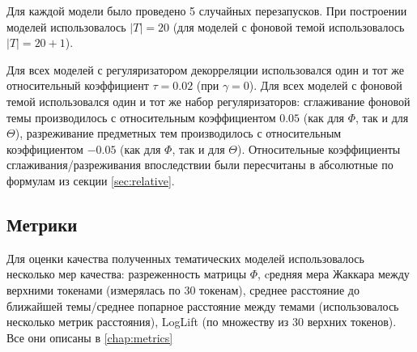 Для каждой модели было проведено 5 случайных перезапусков. При построении моделей использовалось $|T|= 20$ (для моделей с фоновой темой использовалось $|T|= 20+1$).

Для всех моделей с регуляризатором декорреляции использовался один и тот же относительный коэффициент $\tau = 0.02$ (при $\gamma=0$). Для всех моделей с фоновой темой использовался один и тот же набор регуляризаторов: сглаживание фоновой темы производилось с относительным коэффициентом $0.05$ (как для $\Phi$, так и для $\Theta$), разреживание предметных тем производилось  с относительным коэффициентом $-0.05$ (как для $\Phi$, так и для $\Theta$). Относительные коэффициенты сглаживания/разреживания впоследствии были пересчитаны в абсолютные по формулам из секции \ref{sec:relative}.

\subsection{Метрики}

Для оценки качества полученных тематических моделей использовалось несколько мер качества: разреженность матрицы $\Phi$, cредняя мера Жаккара между верхними токенами (измерялась по 30 токенам), среднее расстояние до ближайшей темы/среднее попарное расстояние между темами (использовалось несколько метрик расстояния), LogLift (по множеству из 30 верхних токенов). Все они описаны в \ref{chap:metrics}

